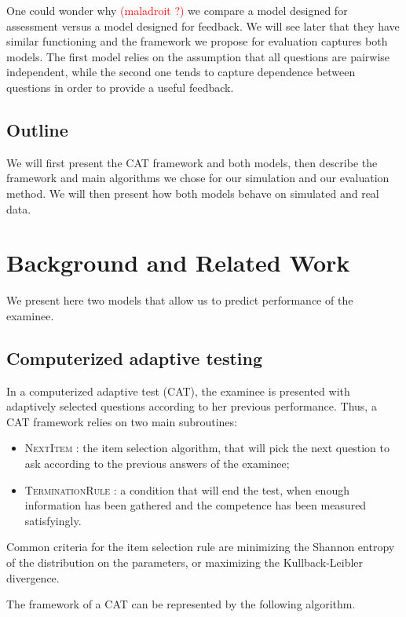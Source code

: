 \documentclass{sig-alternate}
\newcommand\alert[1]{\textcolor{red}{#1}}
\begin{document}
One could wonder why \alert{(maladroit ?)} we compare a model designed for assessment versus a model designed for feedback. We will see later that they have similar functioning and the framework we propose for evaluation captures both models. The first model relies on the assumption that all questions are pairwise independent, while the second one tends to capture dependence between questions in order to provide a useful feedback.

\subsection{Outline}

We will first present the CAT framework and both models, then describe the framework and main algorithms we chose for our simulation and our evaluation method. We will then present how both models behave on simulated and real data.

\section{Background and Related Work}

We present here two models that allow us to predict performance of the examinee.

\subsection{Computerized adaptive testing}

In a computerized adaptive test (CAT), the examinee is presented with adaptively selected questions according to her previous performance. Thus, a CAT framework relies on two main subroutines:
\begin{itemize}
\item \textsc{NextItem} : the item selection algorithm, that will pick the next question to ask according to the previous answers of the examinee;
\item \textsc{TerminationRule} : a condition that will end the test, when enough information has been gathered and the competence has been measured satisfyingly.
\end{itemize}

Common criteria for the item selection rule are minimizing the Shannon entropy of the distribution on the parameters, or maximizing the Kullback-Leibler divergence. %

The framework of a CAT can be represented by the following algorithm.
\end{document}
